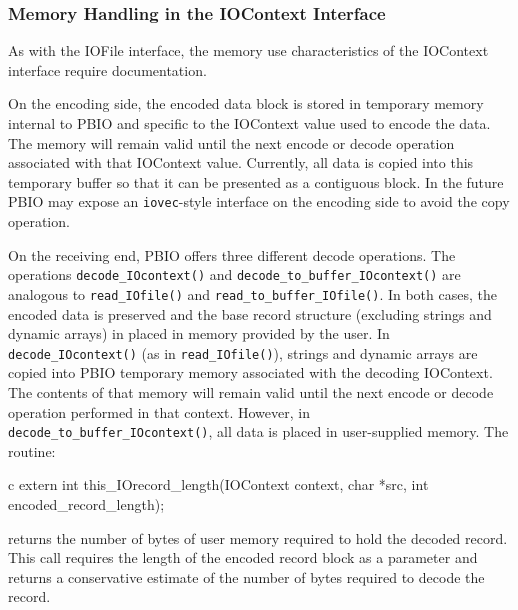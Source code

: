 \documentclass{article}
\begin{document}
\subsubsection{Memory Handling in the IOContext Interface}

As with the IOFile interface, the memory use characteristics of the IOContext
interface require documentation.  

On the encoding side, the encoded data block is stored in temporary memory
internal to PBIO and specific to the IOContext value used to encode the data.
The memory will remain valid until the next encode or decode operation
associated with that IOContext value.  Currently, all data is copied into this
temporary buffer so that it can be presented as a contiguous block.  In the
future PBIO may expose an {\tt iovec}-style interface on the encoding side to
avoid the copy operation.

On the receiving end, PBIO offers three different decode operations.  The
operations {\tt decode\_IOcontext()} and {\tt decode\_to\_buffer\_IOcontext()}
are analogous to {\tt read\_IOfile()} and {\tt read\_to\_buffer\_IOfile()}.
In both cases, the encoded data is preserved and the base record structure
(excluding strings and dynamic arrays) in placed in memory provided by the
user.  In {\tt decode\_IOcontext()} (as in {\tt read\_IOfile()}), strings and
dynamic arrays are copied into PBIO temporary memory associated with the
decoding IOContext.  The contents of that memory will remain valid until the
next encode or decode operation performed in that context.  However, in {\tt
decode\_to\_buffer\_IOcontext()}, all data is placed in user-supplied memory.
The routine:
\begin{code}{c}
extern int
this_IOrecord_length(IOContext context, char *src, int encoded_record_length);
\end{code}
returns the number of bytes of user memory required to hold the decoded record.
This call requires the length of the encoded record block as a parameter and
returns a conservative estimate of the number of bytes required to decode the
record.  
\end{document}
